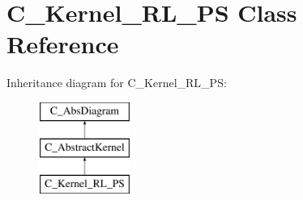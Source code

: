 \hypertarget{class_c___kernel___r_l___p_s}{\section{C\-\_\-\-Kernel\-\_\-\-R\-L\-\_\-\-P\-S Class Reference}
\label{class_c___kernel___r_l___p_s}
}
Inheritance diagram for C\-\_\-\-Kernel\-\_\-\-R\-L\-\_\-\-P\-S\-:\begin{figure}[H]
\begin{center}
\leavevmode
\includegraphics[height=3.000000cm]{class_c___kernel___r_l___p_s}
\end{center}
\end{figure}
